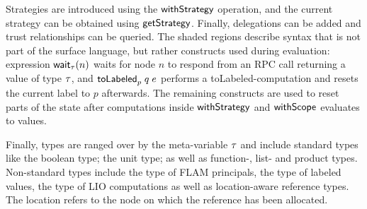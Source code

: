 Strategies are introduced using the $\mathsf{withStrategy}$ operation, and the current strategy can be obtained using $\mathsf{getStrategy}$. Finally, delegations can be added and trust relationships can be queried. The shaded regions describe syntax that is not part of the surface language, but rather constructs used during evaluation: expression $\wait{n}[\type]$ waits for node $n$ to respond from an RPC call returning a value of type $\tau$, and $\internalTolabeled{p}{q}{\expr}$ performs a toLabeled-computation and resets the current label to $p$ afterwards. The remaining constructs are used to reset parts of the state after computations inside $\mathsf{withStrategy}$ and $\mathsf{withScope}$ evaluates to values. 

Finally, types are ranged over by the meta-variable $\tau$ and include standard types like the boolean type; the unit type; as well as function-, list- and product types. Non-standard types include the type of FLAM principals, the type of labeled values, the type of LIO computations as well as location-aware reference types. The location refers to the node on which the reference has been allocated.

